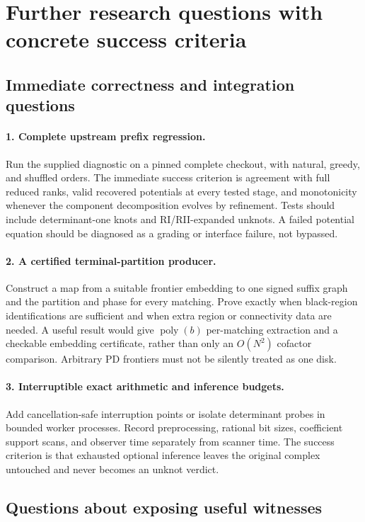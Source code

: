 \documentclass[11pt]{article}
\theoremstyle{definition}
\theoremstyle{remark}
\newcommand{\poly}{\operatorname{poly}}
\begin{document}
\section{Further research questions with concrete success criteria}
\label{sec:questions}

\subsection{Immediate correctness and integration questions}
\paragraph{1. Complete upstream prefix regression.}
Run the supplied diagnostic on a pinned complete checkout, with natural,
greedy, and shuffled orders. The immediate success criterion is agreement
with full reduced ranks, valid recovered potentials at every tested stage,
and monotonicity whenever the component decomposition evolves by refinement.
Tests should include determinant-one knots and RI/RII-expanded unknots.
A failed potential equation should be diagnosed as a grading or interface
failure, not bypassed.

\paragraph{2. A certified terminal-partition producer.}
Construct a map from a suitable frontier embedding to one signed suffix
graph and the partition and phase for every matching. Prove exactly when
black-region identifications are sufficient and when extra region or
connectivity data are needed. A useful result would give $\poly(b)$
per-matching extraction and a checkable embedding certificate, rather than
only an $O(N^2)$ cofactor comparison. Arbitrary PD frontiers must not be
silently treated as one disk.

\paragraph{3. Interruptible exact arithmetic and inference budgets.}
Add cancellation-safe interruption points or isolate determinant probes in
bounded worker processes. Record preprocessing, rational bit sizes,
coefficient support scans, and observer time separately from scanner time.
The success criterion is that exhausted optional inference leaves the
original complex untouched and never becomes an unknot verdict.

\subsection{Questions about exposing useful witnesses}
\end{document}
